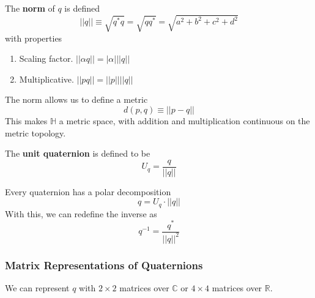   \begin{definition}
    The \textbf{norm} of $q$ is defined
    \begin{equation}
      ||q|| \equiv \sqrt{q^* q} = \sqrt{q q^*} = \sqrt{a^2 + b^2 + c^2 + d^2}
    \end{equation}
    with properties
    \begin{enumerate}
      \item Scaling factor. $||\alpha q|| = |\alpha| ||q||$
      \item Multiplicative. $||p q|| = ||p|| ||q||$
    \end{enumerate}
  \end{definition}

  The norm allows us to define a metric 
  \begin{equation}
    d(p, q) \equiv ||p - q||
  \end{equation}
  This makes $\mathbb{H}$ a metric space, with addition and multiplication continuous on the metric topology. 

  \begin{definition}
    The \textbf{unit quaternion} is defined to be
    \begin{equation}
      U_q = \frac{q}{||q||}
    \end{equation}
  \end{definition}

  \begin{corollary}
    Every quaternion has a polar decomposition
    \begin{equation}
      q = U_q \cdot ||q||
    \end{equation}
    With this, we can redefine the inverse as
    \begin{equation}
      q^{-1} = \frac{q^*}{||q||^2}
    \end{equation}
  \end{corollary}

  \subsubsection{Matrix Representations of Quaternions}

    We can represent $q$ with $2 \times 2$ matrices over $\mathbb{C}$ or $4\times 4 $ matrices over $\mathbb{R}$. 

